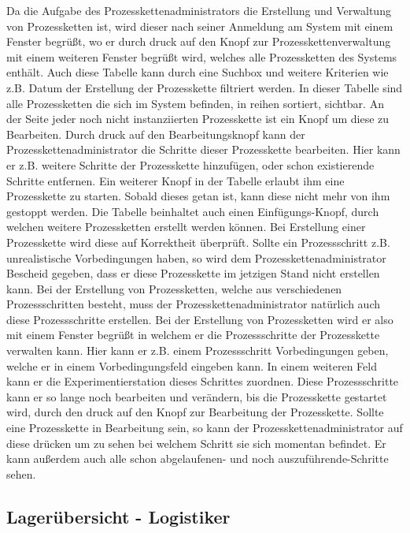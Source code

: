 \documentclass[enabledeprecatedfontcommands,fontsize=12pt,paper=a4,twoside]{scrartcl}
\begin{document}
Da die Aufgabe des Prozesskettenadministrators die Erstellung und Verwaltung von Prozessketten ist, wird dieser nach seiner Anmeldung am System mit einem Fenster begrüßt, wo er durch druck auf den Knopf zur Prozesskettenverwaltung mit einem weiteren Fenster begrüßt wird, welches alle Prozessketten des Systems enthält.
Auch diese Tabelle kann durch eine Suchbox und weitere Kriterien wie z.B. Datum der Erstellung der Prozesskette filtriert werden.
In dieser Tabelle sind alle Prozessketten die sich im System befinden, in reihen sortiert, sichtbar. An der Seite jeder noch nicht instanziierten Prozesskette ist ein Knopf um diese zu Bearbeiten. Durch druck auf den Bearbeitungsknopf kann der Prozesskettenadministrator die Schritte dieser Prozesskette bearbeiten. Hier kann er z.B. weitere Schritte der Prozesskette hinzufügen, oder schon existierende Schritte entfernen.
Ein weiterer Knopf in der Tabelle erlaubt ihm eine Prozesskette zu starten. Sobald dieses getan ist, kann diese nicht mehr von ihm gestoppt werden.
Die Tabelle beinhaltet auch einen Einfügungs-Knopf, durch welchen weitere Prozessketten erstellt werden können.
Bei Erstellung einer Prozesskette wird diese auf Korrektheit überprüft. Sollte ein Prozessschritt z.B. unrealistische Vorbedingungen haben, so wird dem Prozesskettenadministrator Bescheid gegeben, dass er diese Prozesskette im jetzigen Stand nicht erstellen kann.
Bei der Erstellung von Prozessketten, welche aus verschiedenen Prozessschritten besteht, muss der Prozesskettenadministrator natürlich auch diese Prozessschritte erstellen. Bei der Erstellung von Prozessketten wird er also mit einem Fenster begrüßt in welchem er die Prozessschritte der Prozesskette verwalten kann.
Hier kann er z.B. einem Prozessschritt Vorbedingungen geben, welche er in einem Vorbedingungsfeld eingeben kann. In einem weiteren Feld kann er die Experimentierstation dieses Schrittes zuordnen. Diese Prozessschritte kann er so lange noch bearbeiten und verändern, bis die Prozesskette gestartet wird, durch den druck auf den Knopf zur Bearbeitung der Prozesskette. 
Sollte eine Prozesskette in Bearbeitung sein, so kann der Prozesskettenadministrator auf diese drücken um zu sehen bei welchem Schritt sie sich momentan befindet. Er kann außerdem auch alle schon abgelaufenen- und noch auszuführende-Schritte sehen.
 
\subsection{Lagerübersicht - Logistiker}
\end{document}
